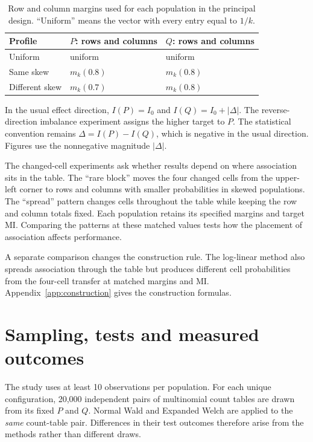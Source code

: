 \begin{table}[htbp]
\centering
\caption{Row and column margins used for each population in the principal
design. ``Uniform'' means the vector with every entry equal to \(1/k\).}
\label{tab:margin-profiles}
\begin{tabular}{@{}lll@{}}
\toprule
Profile & \(P\): rows and columns & \(Q\): rows and columns\\
\midrule
Uniform & uniform & uniform\\
Same skew & \(m_k(0.8)\) & \(m_k(0.8)\)\\
Different skew & \(m_k(0.7)\) & \(m_k(0.8)\)\\
\bottomrule
\end{tabular}
\end{table}

In the usual effect direction, \(I(P)=I_0\) and
\(I(Q)=I_0+|\Delta|\). The reverse-direction imbalance experiment assigns
the higher target to \(P\).
The statistical convention remains \(\Delta=I(P)-I(Q)\), which is negative in
the usual direction. Figures use the nonnegative magnitude \(|\Delta|\).

The changed-cell experiments ask whether results depend on where association
sits in the table. The ``rare block'' moves the four changed cells from the
upper-left corner to rows and columns with smaller probabilities in skewed
populations. The ``spread'' pattern changes cells throughout the table while
keeping the row and column totals fixed. Each population retains its
specified margins and target MI. Comparing the patterns at these matched
values tests how the placement of association affects performance.

A separate comparison changes the construction rule. The log-linear method
also spreads association through the table but produces different cell
probabilities from the four-cell transfer at matched margins and MI\@.
Appendix~\ref{app:construction} gives the construction formulas.

\section{Sampling, tests and measured outcomes}

The study uses at least 10 observations per population.
For each unique configuration, 20,000 independent pairs of multinomial count
tables are drawn from its fixed \(P\) and \(Q\). Normal Wald and Expanded
Welch are applied to the \emph{same} count-table pair. Differences in their
test outcomes therefore arise from the methods rather than different draws.


